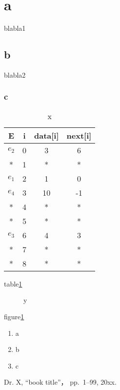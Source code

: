 \documentclass[a4j,twoside]{jarticle}
\begin{document}
\section{a}
blabla1
\subsection{b}
blabla2
\subsubsection{c}
\begin{table}[t]
	\centering
	\begin{tabular}{|c||c|c|c|} \hline
		  E   & i & data[i] & next[i] \\ \hline \hline
		$e_2$ & 0 &    3    &    6    \\
		  *   & 1 &    *    &    *    \\
		$e_1$ & 2 &    1    &    0    \\
		$e_4$ & 3 &   10    &   -1    \\
		  *   & 4 &    *    &    *    \\
		  *   & 5 &    *    &    *    \\
		$e_3$ & 6 &    4    &    3    \\
		  *   & 7 &    *    &    *    \\
		  *   & 8 &    *    &    *    \\ \hline
	\end{tabular}
	\caption{x}
	\label{tab:x}
\end{table}

table\ref{tab:x}

\begin{figure}[t]
	\centering
	\caption{y}
	\label{fig:y}
\end{figure}

figure\ref{fig:y}

\begin{enumerate}
	\item a
	\item b
	\item c
\end{enumerate}

\begin{thebibliography}{99}
		Dr. X,
		``book title''，
		pp.\ 1--99, 20xx.
\end{thebibliography}
\end{document}
